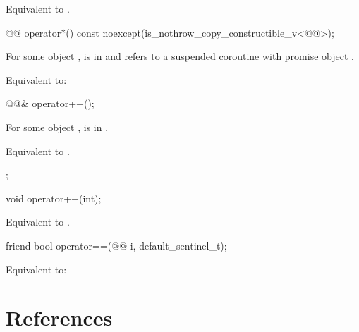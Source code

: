 \documentclass{wg21}
\begin{document}
\begin{addedblock}
\begin{itemdescr}
\effects
Equivalent to .
\end{itemdescr}

\begin{itemdecl}
@@ operator*() const noexcept(is_nothrow_copy_constructible_v<@@>);
\end{itemdecl}

\begin{itemdescr}
\expects
For some  object ,
 is in  and
 refers to
a suspended coroutine with promise object .

\effects
Equivalent to:
\end{itemdescr}

\begin{itemdecl}
@@& operator++();
\end{itemdecl}

\begin{itemdescr}
\expects
For some  object ,
 is in .

\effects
Equivalent to .

\returns
{};
\end{itemdescr}

\begin{itemdecl}
void operator++(int);
\end{itemdecl}

\begin{itemdescr}
\effects
Equivalent to .
\end{itemdescr}

\begin{itemdecl}
friend bool operator==(@@ i, default_sentinel_t);
\end{itemdecl}

\begin{itemdescr}
\effects
Equivalent to: 
\end{itemdescr}
\end{addedblock}

\newpage
\section{References}
\renewcommand{\section}[2]{}%


\end{document}

